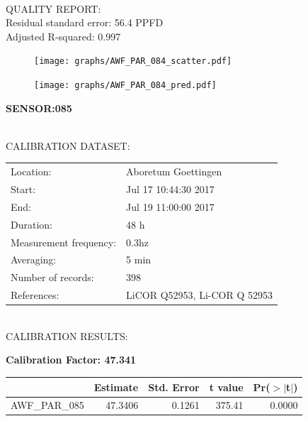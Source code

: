 \documentclass[oneside]{report}
\begin{document}
\hrulefill\\
QUALITY REPORT:\\
Residual standard error: 56.4 PPFD\\
Adjusted R-squared: 0.997



\begin{figure}[H]
  \centering
  \texttt{[image: graphs/AWF\_PAR\_084\_scatter.pdf]}
\end{figure}




\begin{figure}[H]
  \centering
  \texttt{[image: graphs/AWF\_PAR\_084\_pred.pdf]}
\end{figure}

\pagebreak


\begin{center}
\large{\textbf{SENSOR:085}}\\
\end{center}

\hrulefill\\
CALIBRATION DATASET:\\
\begin{table}[h!]
  \centering
  \label{tab:table1}
  \begin{tabular}{ll}
    Location: & Aboretum Goettingen\\ 
    
    
    Start:  & Jul 17 10:44:30 2017 \\
    End:   & Jul 19 11:00:00 2017\\ 
    Duration: & 48 h\\
    Measurement frequency: & 0.3hz\\
    Averaging:  &5 min\\
    Number of records: & 398 \\
    References: & LiCOR Q52953, Li-COR Q 52953 \\
  \end{tabular}
\end{table}

\hrulefill\\
CALIBRATION RESULTS:\\


\begin{center}
\textbf{\large{Calibration Factor: 47.341}}\\
\end{center}
\begin{table}[ht]
\centering
\begin{tabular}{rrrrr}
  \hline
 & Estimate & Std. Error & t value & Pr($>$$|$t$|$) \\ 
  \hline
AWF\_PAR\_085 & 47.3406 & 0.1261 & 375.41 & 0.0000 \\ 
   \hline
\end{tabular}
\end{table}
\end{document}

